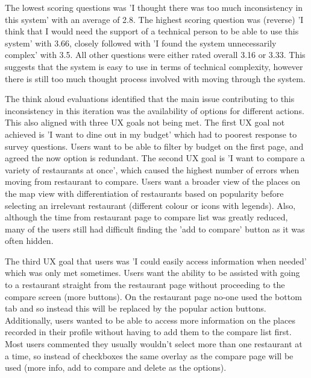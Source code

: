 \documentclass[a4 paper, 12pt]{article}
\begin{document}
   The lowest scoring questions was 'I thought there was too much inconsistency in this system' with an average of 2.8. The highest scoring question was (reverse) 'I think that I would need the support of a technical person to be able to use this system' with 3.66, closely followed with 'I found the system unnecessarily complex' with 3.5. All other questions were either rated overall 3.16 or 3.33. This suggests that the system is easy to use in terms of technical complexity, however there is still too much thought process involved with moving through the system.
   
   The think aloud evaluations identified that the main issue contributing to this inconsistency in this iteration was the availability of options for different actions. This also aligned with three UX goals not being met. The first UX goal not achieved is 'I want to dine out in my budget' which had to poorest response to survey questions. Users want to be able to filter by budget on the first page, and agreed the now option is redundant. The second UX goal is 'I want to compare a variety of restaurants at once', which caused the highest number of errors when moving from restaurant to compare. Users want a broader view of the places on the map view with differentiation of restaurants based on popularity before selecting an irrelevant restaurant (different colour or icons with legends). Also, although the time from restaurant page to compare list was greatly reduced, many of the users still had difficult finding the 'add to compare' button as it was often hidden. 

    The third UX goal that users was 'I could easily access information when needed' which was only met sometimes. Users want the ability to be assisted with going to a restaurant straight from the restaurant page without proceeding to the compare screen (more buttons). On the restaurant page no-one used the bottom tab and so instead this will be replaced by the popular action buttons. Additionally, users wanted to be able to access more information on the places recorded in their profile without having to add them to the compare list first. Most users commented they usually wouldn't select more than one restaurant at a time, so instead of checkboxes the same overlay as the compare page will be used (more info, add to compare and delete as the options).


    
\end{document}
